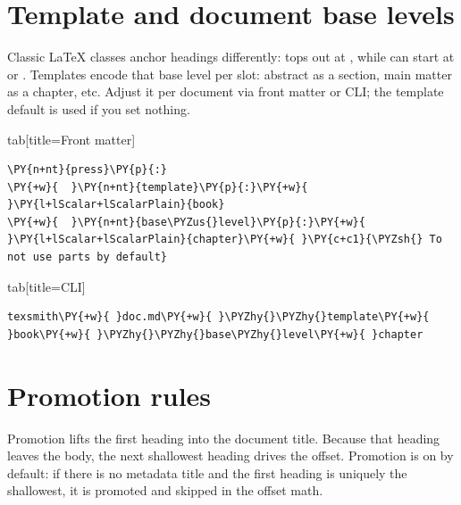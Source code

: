 \documentclass[a4paper,twoside]{article}
\begin{document}
\section{Template and document base levels}
Classic \LaTeX{} classes anchor headings differently:  tops out at , while  can start at  or . Templates encode that base level per slot: abstract as a section, main matter as a chapter, etc. Adjust it per document via front matter or CLI; the template default is used if you set nothing.
\begin{tsdiv}{tab}[title={Front matter}]
\begin{tscode}[lang=yaml, engine=pygments]
\begin{Verbatim}[commandchars=\\\{\},breaklines, breakanywhere, commandchars=\\\{\}]
\PY{n+nt}{press}\PY{p}{:}
\PY{+w}{  }\PY{n+nt}{template}\PY{p}{:}\PY{+w}{ }\PY{l+lScalar+lScalarPlain}{book}
\PY{+w}{  }\PY{n+nt}{base\PYZus{}level}\PY{p}{:}\PY{+w}{ }\PY{l+lScalar+lScalarPlain}{chapter}\PY{+w}{ }\PY{c+c1}{\PYZsh{} To not use parts by default}
\end{Verbatim}
\end{tscode}
\end{tsdiv}
\begin{tsdiv}{tab}[title=CLI]
\begin{tscode}[lang=bash, engine=pygments]
\begin{Verbatim}[commandchars=\\\{\},breaklines, breakanywhere, commandchars=\\\{\}]
texsmith\PY{+w}{ }doc.md\PY{+w}{ }\PYZhy{}\PYZhy{}template\PY{+w}{ }book\PY{+w}{ }\PYZhy{}\PYZhy{}base\PYZhy{}level\PY{+w}{ }chapter
\end{Verbatim}
\end{tscode}
\end{tsdiv}
\section{Promotion rules}
Promotion lifts the first heading into the document title. Because that heading leaves the body, the next shallowest heading drives the offset. Promotion is on by default: if there is no metadata title and the first heading is uniquely the shallowest, it is promoted and skipped in the offset math.
\end{document}
